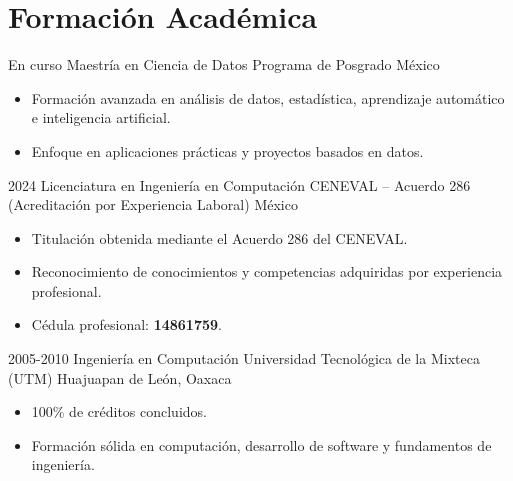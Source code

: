 \section{Formación Académica}

\cventry
{En curso}
{Maestría en Ciencia de Datos}
{Programa de Posgrado}
{México}
{}
{
\begin{itemize}
  \item Formación avanzada en análisis de datos, estadística, aprendizaje automático e inteligencia artificial.
  \item Enfoque en aplicaciones prácticas y proyectos basados en datos.
\end{itemize}
}


\cventry
{2024}
{Licenciatura en Ingeniería en Computación}
{CENEVAL -- Acuerdo 286 (Acreditación por Experiencia Laboral)}
{México}
{}
{
\begin{itemize}
  \item Titulación obtenida mediante el Acuerdo 286 del CENEVAL.
  \item Reconocimiento de conocimientos y competencias adquiridas por experiencia profesional.
  \item Cédula profesional: \textbf{14861759}.
\end{itemize}
}

\cventry
{2005-2010}
{Ingeniería en Computación}
{Universidad Tecnológica de la Mixteca (UTM)}
{Huajuapan de León, Oaxaca}
{}
{
\begin{itemize}
  \item 100\% de créditos concluidos.
  \item Formación sólida en computación, desarrollo de software y fundamentos de ingeniería.
\end{itemize}
}
